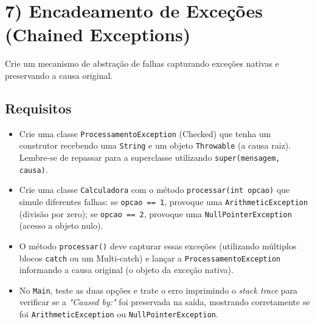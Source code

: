 \documentclass[12pt]{article}
\begin{document}
\section*{7) Encadeamento de Exceções (Chained Exceptions)}
Crie um mecanismo de abstração de falhas capturando exceções nativas e preservando a causa original.

\begin{center}
\end{center}

\subsection*{Requisitos}
\begin{itemize}
    \item Crie uma classe \texttt{ProcessamentoException} (Checked) que tenha um construtor recebendo uma \texttt{String} e um objeto \texttt{Throwable} (a causa raiz). Lembre-se de repassar para a superclasse utilizando \texttt{super(mensagem, causa)}.
    \item Crie uma classe \texttt{Calculadora} com o método \texttt{processar(int opcao)} que simule diferentes falhas: se \texttt{opcao == 1}, provoque uma \texttt{ArithmeticException} (divisão por zero); se \texttt{opcao == 2}, provoque uma \texttt{NullPointerException} (acesso a objeto nulo).
    \item O método \texttt{processar()} deve capturar essas exceções (utilizando múltiplos blocos \texttt{catch} ou um Multi-catch) e lançar a \texttt{ProcessamentoException} informando a causa original (o objeto da exceção nativa).
    \item No \texttt{Main}, teste as duas opções e trate o erro imprimindo o \textit{stack trace} para verificar se a \textit{"Caused by:"} foi preservada na saída, mostrando corretamente se foi \texttt{ArithmeticException} ou \texttt{NullPointerException}.
\end{itemize}
\end{document}
